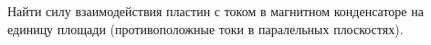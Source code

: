\begin{tproblem}
  Найти силу взаимодействия пластин с током в магнитном конденсаторе
  на единицу площади (противоположные токи в паралельных плоскостях).
\end{tproblem}